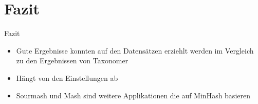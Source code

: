 \section{Fazit}

\begin{frame}{Fazit}
    \begin{itemize}
        \item Gute Ergebnisse konnten auf den Datensätzen erziehlt werden im Vergleich zu den Ergebnissen von Taxonomer \cite{taxonomer} 
        \item Hängt von den Einstellungen ab
        \item Sourmash \cite{sourmash} und Mash \cite{mash} sind weitere Applikationen die auf MinHash basieren
    \end{itemize}
\end{frame}